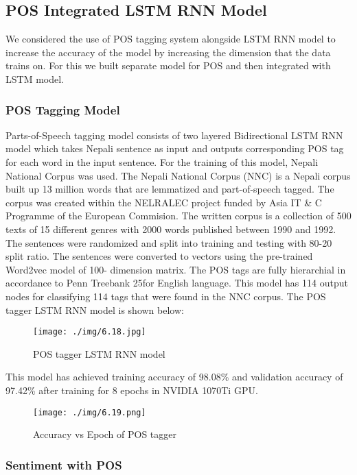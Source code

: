         \subsection{POS Integrated LSTM RNN Model}
We considered the use of POS tagging system alongside LSTM RNN model to increase
the accuracy of the model by increasing the dimension that the data trains on. For this
we built separate model for POS and then integrated with LSTM model.
            \subsubsection{POS Tagging Model}
Parts-of-Speech tagging model consists of two layered Bidirectional LSTM RNN
model which takes Nepali sentence as input and outputs corresponding POS tag for
each word in the input sentence. For the training of this model, Nepali National Corpus
was used. The Nepali National Corpus (NNC) is a Nepali corpus built up 13 million
words that are lemmatized and part-of-speech tagged. The corpus was created within
the NELRALEC project funded by Asia IT & C Programme of the European
Commision. The written corpus is a collection of 500 texts of 15 different genres with
2000 words published between 1990 and 1992. The sentences were randomized and
split into training and testing with 80-20 split ratio.
The sentences were converted to vectors using the pre-trained Word2vec model of 100-
dimension matrix. The POS tags are fully hierarchial in accordance to Penn Treebank
25for English language. This model has 114 output nodes for classifying 114 tags that
were found in the NNC corpus.
The POS tagger LSTM RNN model is shown below:

        \begin{figure}[hbt!]
            \centering
                \texttt{[image: ./img/6.18.jpg]}
                \caption{POS tagger LSTM RNN model}
        \end{figure}
This model has achieved training accuracy of 98.08\% and validation accuracy of
97.42\% after training for 8 epochs in NVIDIA 1070Ti GPU.

        \begin{figure}[hbt!]
            \centering
                \texttt{[image: ./img/6.19.png]}
                \caption{Accuracy vs Epoch of POS tagger}
        \end{figure}

                \subsubsection{Sentiment with POS}
        
